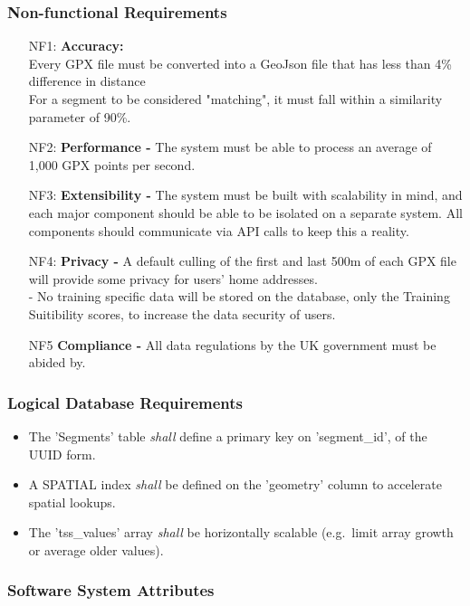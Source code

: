 \documentclass[11pt,twoside]{report}
\begin{document}
\subsubsection{Non-functional Requirements}
\begin{enumerate}
	\item[NF1:] \textbf{Accuracy:} \\
	      \subitem Every GPX file must be converted into a GeoJson file that has less than 4\% difference in distance\\
	      \subitem For a segment \citep{Bicycling2017} to be considered "matching", it must fall within a similarity parameter of 90\%.
	\item[NF2:] \textbf{Performance - } The system must be able to process an average of 1,000 GPX points per second.
	\item[NF3:] \textbf{Extensibility - } The system must be built with scalability in mind, and each major component should be able to be isolated
	      on a separate system. All components should communicate via API calls to keep this a reality.
	\item[NF4:] \textbf{Privacy - } A default culling of the first and last 500m of each GPX file will provide some privacy for users' home addresses.\\
	      - No training specific data will be stored on the database, only the Training Suitibility scores, to increase the data security of
	      users.
	\item[NF5] \textbf{Compliance - } All data regulations by the UK government must be abided by.
\end{enumerate}


\subsubsection{Logical Database Requirements}
\begin{itemize}
	\item The 'Segments' table \emph{shall} define a primary key on 'segment\_id', of the UUID form.
	\item A SPATIAL index \emph{shall} be defined on the 'geometry' column to accelerate spatial lookups.
	\item The 'tss\_values' array \emph{shall} be horizontally scalable (e.g.\ limit array growth or average older values).
\end{itemize}

\subsubsection{Software System Attributes}
\end{document}
